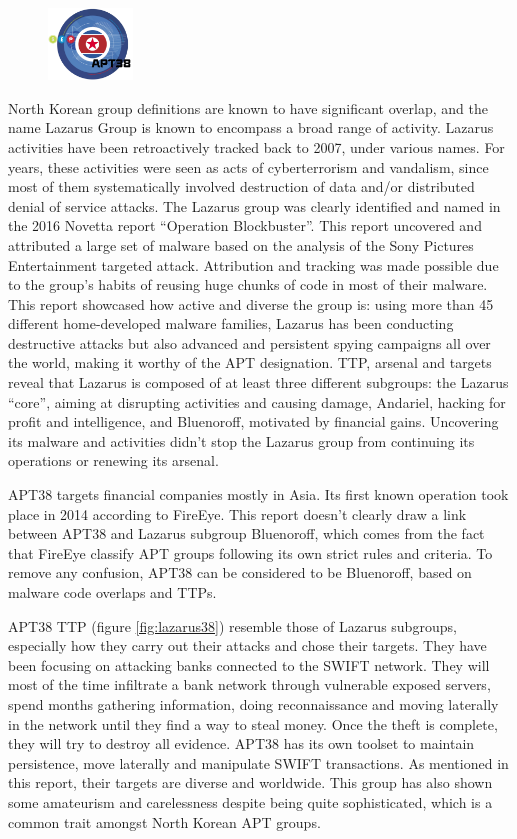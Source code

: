 \documentclass[12pt]{article}
\begin{document}
        \begin{figure}
        \centering
        \includegraphics[width=0.20\textwidth]{figures/apt38.png}
        \end{figure}
        North Korean group definitions are known to have significant overlap, and the name Lazarus Group is known to encompass a broad range of activity. Lazarus activities have been retroactively tracked back to 2007, under various names. For years, these activities were seen as acts of cyberterrorism and vandalism, since most of them systematically involved destruction of data and/or distributed denial of service attacks. The Lazarus group was clearly identified and named in the 2016 Novetta report “Operation Blockbuster”. This report uncovered and attributed a large set of malware based on the analysis of the Sony Pictures Entertainment targeted attack. Attribution and tracking was made possible due to the group’s habits of reusing huge chunks of code in most of their malware. This report showcased how active and diverse the group is: using more than 45 different home-developed malware families, Lazarus has been conducting destructive attacks but also advanced and persistent spying campaigns all over the world, making it worthy of the APT designation. TTP, arsenal and targets reveal that Lazarus is composed of at least three different subgroups: the Lazarus “core”, aiming at disrupting activities and causing damage, Andariel, hacking for profit and intelligence, and Bluenoroff, motivated by financial gains. Uncovering its malware and activities didn’t stop the Lazarus group from continuing its operations or renewing its arsenal. 
        
        APT38 targets financial companies mostly in Asia. Its first known operation took place in 2014 according to FireEye. This report doesn’t clearly draw a link between APT38 and Lazarus subgroup Bluenoroff, which comes from the fact that FireEye classify APT groups following its own strict rules and criteria. To remove any confusion, APT38 can be considered to be Bluenoroff, based on malware code overlaps and TTPs. 
        
        APT38 TTP (figure \ref{fig:lazarus38}) resemble those of Lazarus subgroups, especially how they carry out their attacks and chose their targets. They have been focusing on attacking banks connected to the SWIFT network. They will most of the time infiltrate a bank network through vulnerable exposed servers, spend months gathering information, doing reconnaissance and moving laterally in the network until they find a way to steal money. Once the theft is complete, they will try to destroy all evidence.
        APT38 has its own toolset to maintain persistence, move laterally and manipulate SWIFT transactions. As mentioned in this report, their targets are diverse and worldwide. This group has also shown some amateurism and carelessness despite being quite sophisticated, which is a common trait amongst North Korean APT groups.
        
\end{document}
